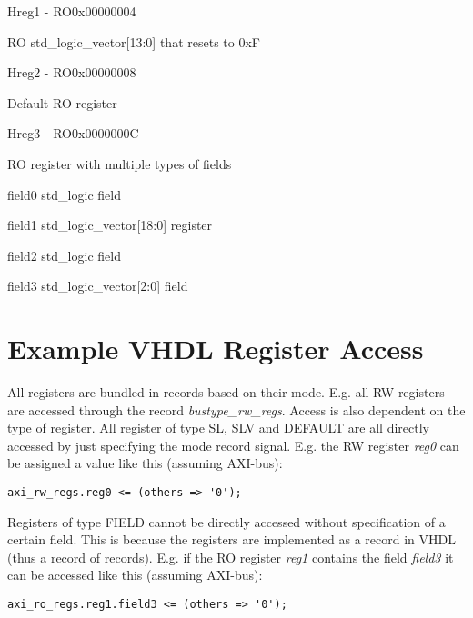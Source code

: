 \documentclass{article}
\begin{document}
\begin{register}{H}{reg1 - RO}{0x00000004}
  \par RO std{\_}logic{\_}vector[13:0] that resets to 0xF \regnewline
  \label{reg1}
\regnewline
\end{register}

\begin{register}{H}{reg2 - RO}{0x00000008}
  \par Default RO register \regnewline
  \label{reg2}
\regnewline
\end{register}

\begin{register}{H}{reg3 - RO}{0x0000000C}
  \par RO register with multiple types of fields \regnewline
  \label{reg3}
\regnewline
  \begin{regdesc}\begin{reglist}[field0]
    \item [field0] std{\_}logic field    \item [field1] std{\_}logic{\_}vector[18:0] register    \item [field2] std{\_}logic field    \item [field3] std{\_}logic{\_}vector[2:0] field  \end{reglist}\end{regdesc}
\end{register}

\section{Example VHDL Register Access}

\par
All registers are bundled in records based on their mode. E.g. all RW registers are accessed through the record \textit{bustype\_rw\_regs}. Access is also dependent on the type of register. All register of type SL, SLV and DEFAULT are all directly accessed by just specifying the mode record signal. E.g. the RW register \textit{reg0} can be assigned a value like this (assuming AXI-bus):

\begin{lstlisting}[style=vhdl]
axi_rw_regs.reg0 <= (others => '0');
\end{lstlisting}

\par Registers of type FIELD cannot be directly accessed without specification of a certain field. This is because the registers are implemented as a record in VHDL (thus a record of records). E.g. if the RO register \textit{reg1} contains the field \textit{field3} it can be accessed like this (assuming AXI-bus):

\begin{lstlisting}[style=vhdl]
axi_ro_regs.reg1.field3 <= (others => '0');
\end{lstlisting}
\end{document}
